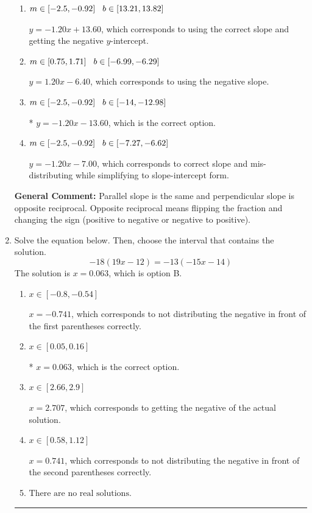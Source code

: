 \documentclass{extbook}[14pt]
\newcommand{\litem}[1]{\item #1

\rule{\textwidth}{0.4pt}}
\begin{document}
\begin{enumerate}
{\begin{enumerate}[label=\Alph*.]
 $y = -0.83x - 13.60$, which corresponds to using the reciprocal slope $(1/m)$.
\item \( m \in [-2.5, -0.92] \hspace*{3mm} b \in [13.21, 13.82] \)

 $y = -1.20x + 13.60$, which corresponds to using the correct slope and getting the negative $y$-intercept.
\item \( m \in [0.75, 1.71] \hspace*{3mm} b \in [-6.99, -6.29] \)

 $y = 1.20x - 6.40$, which corresponds to using the negative slope.
\item \( m \in [-2.5, -0.92] \hspace*{3mm} b \in [-14, -12.98] \)

* $y = -1.20x - 13.60$, which is the correct option.
\item \( m \in [-2.5, -0.92] \hspace*{3mm} b \in [-7.27, -6.62] \)

 $y = -1.20x - 7.00$, which corresponds to correct slope and mis-distributing while simplifying to slope-intercept form.
\end{enumerate}

\textbf{General Comment:} Parallel slope is the same and perpendicular slope is opposite reciprocal. Opposite reciprocal means flipping the fraction and changing the sign (positive to negative or negative to positive).
}
\litem{
Solve the equation below. Then, choose the interval that contains the solution.
\[ -18(19x -12) = -13(-15x -14) \]The solution is \( x = 0.063 \), which is option B.\begin{enumerate}[label=\Alph*.]
\item \( x \in [-0.8, -0.54] \)

$x = -0.741$, which corresponds to not distributing the negative in front of the first parentheses correctly.
\item \( x \in [0.05, 0.16] \)

* $x = 0.063$, which is the correct option.
\item \( x \in [2.66, 2.9] \)

$x = 2.707$, which corresponds to getting the negative of the actual solution.
\item \( x \in [0.58, 1.12] \)

$x = 0.741$, which corresponds to not distributing the negative in front of the second parentheses correctly.
\item \( \text{There are no real solutions.} \)


\end{enumerate}}
\end{enumerate}
\end{document}
